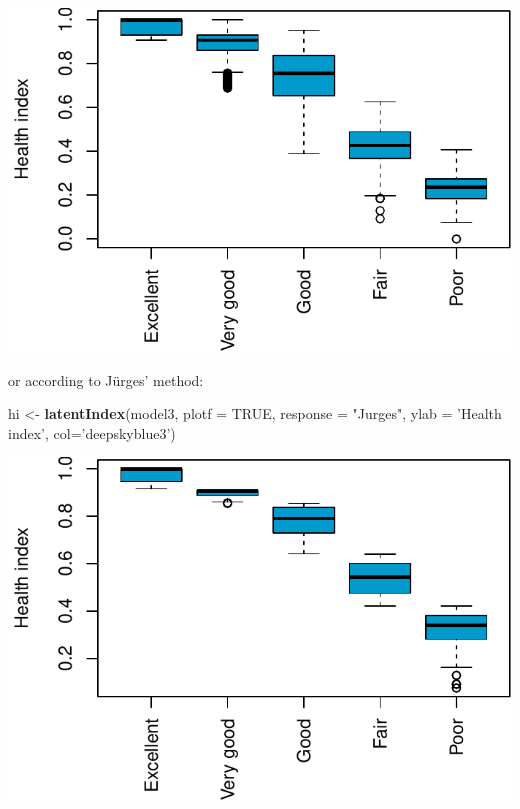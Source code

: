 \documentclass[]{article}
\newenvironment{Shaded}{\begin{snugshade}}{\end{snugshade}}
\newcommand{\DataTypeTok}[1]{\textcolor[rgb]{0.13,0.29,0.53}{#1}}
\newcommand{\KeywordTok}[1]{\textcolor[rgb]{0.13,0.29,0.53}{\textbf{#1}}}
\newcommand{\NormalTok}[1]{#1}
\newcommand{\OtherTok}[1]{\textcolor[rgb]{0.56,0.35,0.01}{#1}}
\newcommand{\StringTok}[1]{\textcolor[rgb]{0.31,0.60,0.02}{#1}}
\begin{document}
\begin{center}\includegraphics{vignette_files/figure-latex/unnamed-chunk-17-1} \end{center}

or according to Jürges' method:

\begin{Shaded}
\begin{Highlighting}[]
\NormalTok{hi <-}\StringTok{ }\KeywordTok{latentIndex}\NormalTok{(model3, }\DataTypeTok{plotf =} \OtherTok{TRUE}\NormalTok{, }\DataTypeTok{response =} \StringTok{"Jurges"}\NormalTok{, }
                  \DataTypeTok{ylab =} \StringTok{'Health index'}\NormalTok{, }\DataTypeTok{col=}\StringTok{'deepskyblue3'}\NormalTok{)}
\end{Highlighting}
\end{Shaded}

\begin{center}\includegraphics{vignette_files/figure-latex/unnamed-chunk-18-1} \end{center}
\end{document}
